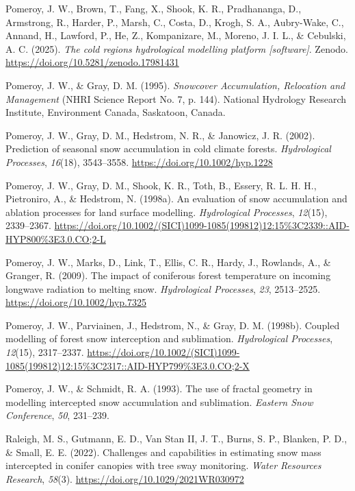 \documentclass[
]{agujournal2019}
\newlength{\cslhangindent}
\newenvironment{CSLReferences}[2] %
 {\begin{list}{}{%
  \setlength{\itemindent}{0pt}
  \setlength{\leftmargin}{0pt}
  \setlength{\parsep}{0pt}
  \ifodd #1
   \setlength{\leftmargin}{\cslhangindent}
   \setlength{\itemindent}{-1\cslhangindent}
  \fi
  \setlength{\itemsep}{#2\baselineskip}}}
 {\end{list}}
\begin{document}
\begin{CSLReferences}{1}{0}
Pomeroy, J. W., Brown, T., Fang, X., Shook, K. R., Pradhananga, D.,
Armstrong, R., Harder, P., Marsh, C., Costa, D., Krogh, S. A.,
Aubry-Wake, C., Annand, H., Lawford, P., He, Z., Kompanizare, M.,
Moreno, J. I. L., \& Cebulski, A. C. (2025). \emph{The cold regions
hydrological modelling platform {[}software{]}}. Zenodo.
\url{https://doi.org/10.5281/zenodo.17981431}

Pomeroy, J. W., \& Gray, D. M. (1995). \emph{Snowcover {Accumulation},
{Relocation} and {Management}} (NHRI Science Report No. 7, p. 144).
National Hydrology Research Institute, Environment Canada, Saskatoon,
Canada.

Pomeroy, J. W., Gray, D. M., Hedstrom, N. R., \& Janowicz, J. R. (2002).
Prediction of seasonal snow accumulation in cold climate forests.
\emph{Hydrological Processes}, \emph{16}(18), 3543--3558.
\url{https://doi.org/10.1002/hyp.1228}

Pomeroy, J. W., Gray, D. M., Shook, K. R., Toth, B., Essery, R. L. H.
H., Pietroniro, A., \& Hedstrom, N. (1998a). An evaluation of snow
accumulation and ablation processes for land surface modelling.
\emph{Hydrological Processes}, \emph{12}(15), 2339--2367.
\url{https://doi.org/10.1002/(SICI)1099-1085(199812)12:15\%3C2339::AID-HYP800\%3E3.0.CO;2-L}

Pomeroy, J. W., Marks, D., Link, T., Ellis, C. R., Hardy, J., Rowlands,
A., \& Granger, R. (2009). The impact of coniferous forest temperature
on incoming longwave radiation to melting snow. \emph{Hydrological
Processes}, \emph{23}, 2513--2525.
\url{https://doi.org/10.1002/hyp.7325}

Pomeroy, J. W., Parviainen, J., Hedstrom, N., \& Gray, D. M. (1998b).
Coupled modelling of forest snow interception and sublimation.
\emph{Hydrological Processes}, \emph{12}(15), 2317--2337.
\url{https://doi.org/10.1002/(SICI)1099-1085(199812)12:15\%3C2317::AID-HYP799\%3E3.0.CO;2-X}

Pomeroy, J. W., \& Schmidt, R. A. (1993). The use of fractal geometry in
modelling intercepted snow accumulation and sublimation. \emph{Eastern
Snow Conference}, \emph{50}, 231--239.

Raleigh, M. S., Gutmann, E. D., Van Stan II, J. T., Burns, S. P.,
Blanken, P. D., \& Small, E. E. (2022). Challenges and capabilities in
estimating snow mass intercepted in conifer canopies with tree sway
monitoring. \emph{Water Resources Research}, \emph{58}(3).
\url{https://doi.org/10.1029/2021WR030972}


\end{CSLReferences}
\end{document}
